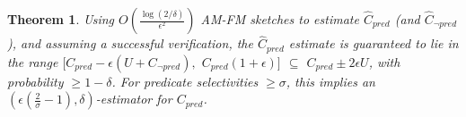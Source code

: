 \documentclass[10pt,twocolumn]{article}
\newcommand{\comm}[2]{[{\textbf{\color{green}#1:}}{\color{red}\textit{#2}}]}
\renewcommand{\comm}[2]{}
\newcommand{\amfm}{AM-FM\xspace}
\newcommand{\cpred}{\ensuremath{C_\mathit{pred}}\xspace}
\newcommand{\cnpred}{\ensuremath{C_{\neg\mathit{pred}}}\xspace}
\newcommand{\estcpred}{\ensuremath{\hat{C}_\mathit{pred}}\xspace}
\newcommand{\estcnpred}{\ensuremath{\hat{C}_{\neg\mathit{pred}}}\xspace}
\newtheorem{theorem}{Theorem}
\newcommand{\reportsubmission}[2]{#2}
\begin{document}
\begin{theorem}
Using $O(\frac{\log(2/\delta)}{\epsilon^2})$ \amfm sketches to estimate 
$\estcpred$ (and $\estcnpred$),
and assuming a successful verification,
the $\estcpred$ estimate is guaranteed to lie in the range
$[\cpred-\epsilon(U+\cnpred),$ $\cpred (1+\epsilon)]$ $\subseteq$ $\cpred\pm 2\epsilon U$,
with probability $\geq 1-\delta$.
For predicate selectivities $\geq\sigma$, this implies an 
$(\epsilon(\frac{2}{\sigma}-1), \delta)$-estimator for
$\cpred$.
\label{thm:verifcpred}
\label{thm:amfm}
\end{theorem}
\end{document}
